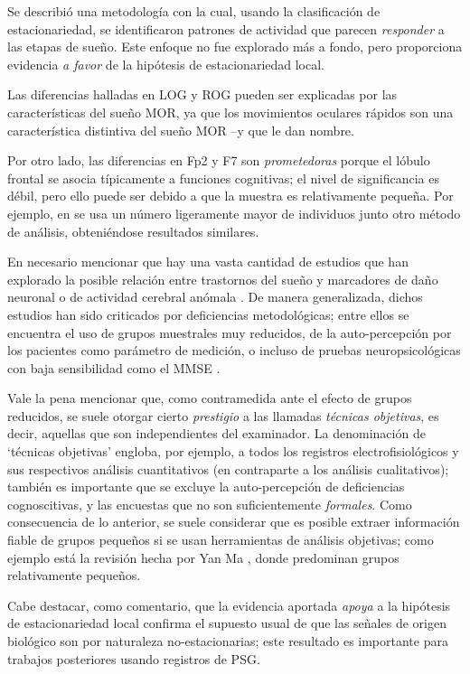 \documentclass[12pt,letterpaper]{book}
\begin{document}
Se describió una metodología con la cual, usando la clasificación de estacionariedad, se identificaron patrones de actividad que parecen \textit{responder} a las etapas de sueño.
%
Este enfoque no fue explorado más a fondo, pero proporciona evidencia \textit{a favor} de la hipótesis de estacionariedad local.

Las diferencias halladas en LOG y ROG pueden ser explicadas por las características del sueño MOR, ya que los movimientos oculares rápidos son una característica distintiva del sueño MOR --y que le dan nombre.

Por otro lado, las diferencias en Fp2 y F7 son \textit{prometedoras} porque el lóbulo frontal se asocia típicamente a funciones cognitivas; el nivel de significancia es débil, pero ello puede ser debido a que la muestra es relativamente pequeña.
%
Por ejemplo, en \cite{FRONTIERS} se usa un número ligeramente mayor de individuos junto otro método de análisis, obteniéndose resultados similares.

En necesario mencionar que hay una vasta cantidad de estudios que han explorado la posible relación entre trastornos del sueño y marcadores de daño neuronal o de actividad cerebral anómala \cite{porter15}.
%
De manera generalizada, dichos estudios han sido criticados por deficiencias metodológicas; entre ellos se encuentra el uso de grupos muestrales muy reducidos, de la auto-percepción por los pacientes como parámetro de medición, o incluso de pruebas neuropsicológicas con baja sensibilidad como el MMSE \cite{scullin15}.

Vale la pena mencionar que, como {contramedida} ante el efecto de grupos reducidos, se suele otorgar cierto \textit{prestigio} a las llamadas \textit{técnicas objetivas}, es decir, aquellas que son independientes del examinador.
%
La denominación de `técnicas objetivas' engloba, por ejemplo, a todos los registros electrofisiológicos y sus respectivos análisis cuantitativos (en contraparte a los análisis cualitativos); también es importante que se excluye la auto-percepción de deficiencias cognoscitivas, y las encuestas que no son suficientemente \textit{formales}.
%
Como consecuencia de lo anterior, se suele considerar que es posible extraer información fiable de grupos pequeños si se usan herramientas de análisis objetivas; como ejemplo está la revisión hecha por Yan Ma \cite{ma18}, donde predominan grupos relativamente pequeños.

Cabe destacar, como comentario, que la evidencia aportada \textit{apoya} a la hipótesis de estacionariedad local confirma el supuesto usual de que las señales de origen biológico son por naturaleza no-estacionarias; este resultado es importante para trabajos posteriores usando registros de PSG.
\end{document}
